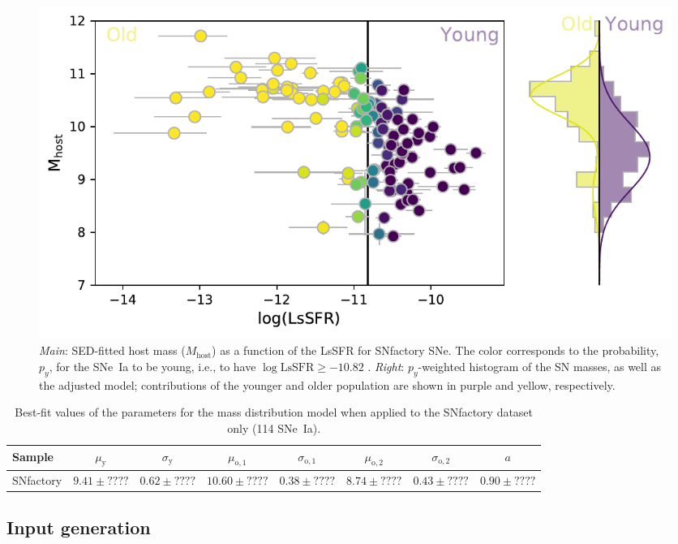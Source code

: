\documentclass[]{aa}
\begin{document}
\begin{figure}[]
    \centering
    \includegraphics[width=\linewidth]{model_mass_3G3M3S_hist.pdf}
    \caption{\textit{Main}: SED-fitted host mass
        ($M_\mathrm{host}$) as a function of the LsSFR for SNfactory SNe. The color
        corresponds to the probability, $p_y$, for the SNe~Ia to be young, i.e.,
        to have $\log\mathrm{LsSFR} \geq -10.82$ \citep[see][]{rigault2020}.
    \textit{Right}: $p_y$-weighted histogram of the SN masses, as well as the
adjusted model; contributions of the younger and older population are shown
in purple and yellow, respectively.}
    \label{fig:massmodel}
\end{figure}

\begin{table}
    \centering
    \caption{Best-fit values of the parameters for the mass distribution
    model when applied to the SNfactory dataset only (114 SNe~Ia).}
    \label{tab:modelresults}
    \begin{tabular}{lccccccc}
        \hline\hline
        Sample  & $\mu_\mathrm{y}  $ & $\sigma_\mathrm{y}$
                & $\mu_\mathrm{o,1}$ & $\sigma_\mathrm{o,1}$
                & $\mu_\mathrm{o,2}$ & $\sigma_\mathrm{o,2}$
                & $a$ \\
        \hline
        SNfactory & $ 9.41 \pm ???? $ & $0.62 \pm ????$
                  & $10.60 \pm ???? $ & $0.38 \pm ????$
                  & $ 8.74 \pm ???? $ & $0.43 \pm ????$
                  & $ 0.90 \pm ???? $ \\
        \hline
    \end{tabular}
\end{table}

\subsection{Input generation}
\end{document}
